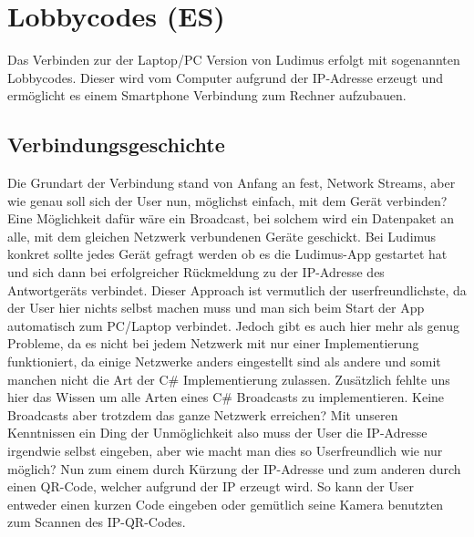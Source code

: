 \section{Lobbycodes (ES)} \label{lobbycodes}
Das Verbinden zur der Laptop/PC Version von Ludimus erfolgt mit sogenannten Lobbycodes. Dieser wird vom Computer aufgrund der IP-Adresse erzeugt und ermöglicht es einem Smartphone Verbindung zum Rechner aufzubauen.
\subsection{Verbindungsgeschichte}
Die Grundart der Verbindung stand von Anfang an fest, Network Streams, aber wie genau soll sich der User nun, möglichst einfach, mit dem Gerät verbinden? Eine Möglichkeit dafür wäre ein Broadcast, bei solchem wird ein Datenpaket an alle, mit dem gleichen Netzwerk verbundenen Geräte geschickt. Bei Ludimus konkret sollte jedes Gerät gefragt werden ob es die Ludimus-App gestartet hat und sich dann bei erfolgreicher Rückmeldung zu der IP-Adresse des Antwortgeräts verbindet. Dieser Approach ist vermutlich der userfreundlichste, da der User hier nichts selbst machen muss und man sich beim Start der App automatisch zum PC/Laptop verbindet. Jedoch gibt es auch hier mehr als genug Probleme, da es nicht bei jedem Netzwerk mit nur einer Implementierung funktioniert, da einige Netzwerke anders eingestellt sind als andere und somit manchen nicht die Art der C\# Implementierung zulassen. Zusätzlich fehlte uns hier das Wissen um alle Arten eines C\# Broadcasts zu implementieren. Keine Broadcasts aber trotzdem das ganze Netzwerk erreichen? Mit unseren Kenntnissen ein Ding der Unmöglichkeit also muss der User die IP-Adresse irgendwie selbst eingeben, aber wie macht man dies so Userfreundlich wie nur möglich? Nun zum einem durch Kürzung der IP-Adresse und zum anderen durch einen QR-Code, welcher aufgrund der IP erzeugt wird. So kann der User entweder einen kurzen Code eingeben oder gemütlich seine Kamera benutzten zum Scannen des IP-QR-Codes.
